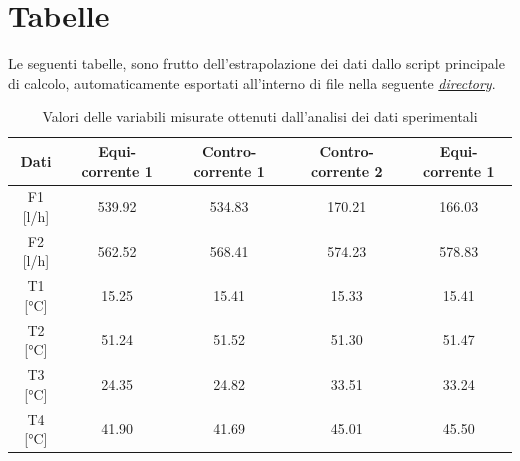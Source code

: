 \documentclass[a4paper,10pt]{article}                                                                                       %
\begin{document}
\section{Tabelle}                                                                                                           %
\label{sec:tables}                                                                                                          %
  Le seguenti tabelle, sono frutto dell'estrapolazione dei dati dallo script principale di calcolo, automaticamente
  esportati all'interno di file nella seguente
  \textit{\href{https://github.com/CristianMerli/DataAnalysis/tree/master/final_doc/code_exports/output}{directory}}.
\begin{table}[H]                                                                                                            %
  \caption{Valori delle variabili misurate ottenuti dall'analisi dei dati sperimentali}                                     %
  \label{tab:measures_data}                                                                                                 %
  \vspace{3mm}                                                                                                              %
  \centering                                                                                                                %
  \begin{tabular}{||c|c|c|c|c||}                                                                                            %
    \hline
    Dati      & Equi-corrente 1 & Contro-corrente 1 & Contro-corrente 2 & Equi-corrente 1 \\
    \hline\hline
    F1 [l/h]  & 539.92          & 534.83            & 170.21            & 166.03          \\
    F2 [l/h]  & 562.52          & 568.41            & 574.23            & 578.83          \\
    T1 [°C]   & 15.25           & 15.41             & 15.33             & 15.41           \\
    T2 [°C]   & 51.24           & 51.52             & 51.30             & 51.47           \\
    T3 [°C]   & 24.35           & 24.82             & 33.51             & 33.24           \\
    T4 [°C]   & 41.90           & 41.69             & 45.01             & 45.50           \\
    \hline
  \end{tabular}                                                                                                             %
\end{table}                                                                                                                 %
\end{document}
